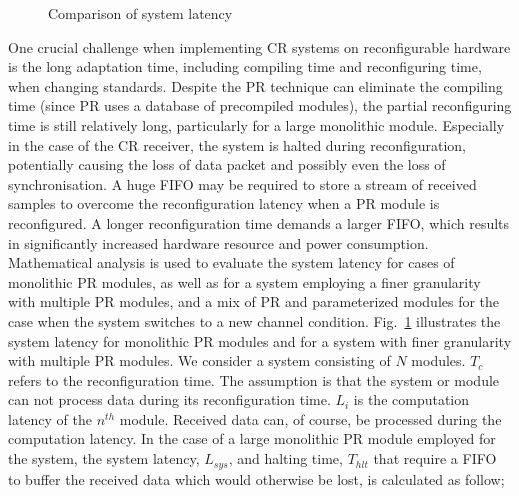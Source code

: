 \begin{figure}
\caption{Comparison of system latency}
\label{fig:timing}
\end{figure}
 
One crucial challenge when implementing CR systems on reconfigurable hardware is the long adaptation time, including compiling time and reconfiguring time, when changing standards. 
Despite the PR technique can eliminate the compiling time (since PR uses a database of precompiled modules), the partial reconfiguring time is still relatively long, particularly for a large monolithic module. Especially in the case of the CR receiver, the system is halted during reconfiguration, potentially causing the loss of data packet and possibly even the loss of synchronisation. A huge FIFO may be required to store a stream of received samples to overcome the reconfiguration latency when a PR module is reconfigured. A longer reconfiguration time demands a larger FIFO, which results in significantly increased hardware resource and power consumption. Mathematical analysis is used to evaluate the system latency for cases of monolithic PR modules, as well as for a system employing a finer granularity with multiple PR modules, and a mix of PR and parameterized modules for the case when the system switches to a new channel condition. Fig.~\ref{fig:timing} illustrates the system latency for monolithic PR modules and for a system with finer granularity with multiple PR modules. We consider a system consisting of $N$ modules. $T_{c}$ refers to the reconfiguration time. The assumption is that the system or module can not process data during its reconfiguration time. $L_{i}$ is the computation latency of  the $n^{th}$ module. Received data can, of course, be processed during the computation latency. In the case of a large monolithic PR module employed for the system, the system latency, $L_{sys}$, and halting time, $T_{hlt}$ that require a FIFO to buffer the received data which would otherwise be lost, is calculated as follow;

